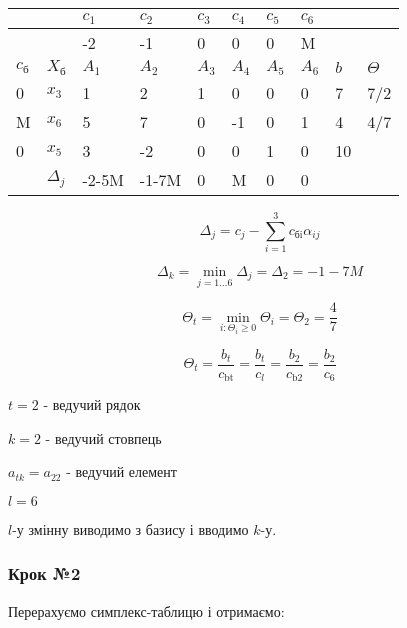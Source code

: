 \documentclass[a4paper, 12pt]{article}
\begin{document}
\begin{table}[H]
    \centering
    \begin{tabular}{|l|l|l|l|l|l|l|l|l|l|}
    \hline
         &  & $c_1$ & $c_2$ & $c_3$ & $c_4$ & $c_5$ & $c_6$ & & \\ \hline
         &  & -2 & -1 & 0 & 0 & 0 & M &  &  \\ \hline
         $c_\text{б}$ & $X_\text{б}$ & $A_1$ & $A_2$ & $A_3$ & $A_4$ & $A_5$ & $A_6$ & $b$  & $\Theta$ \\ \hline
        0 & $x_3$ & 1 & 2 & 1 & 0 & 0 & 0 & 7 & 7/2 \\ \hline
        M & $x_6$ & 5 & 7 & 0 & -1 & 0 & 1 & 4 & 4/7 \\ \hline
        0 & $x_5$ & 3 & -2 & 0 & 0 & 1 & 0 & 10 &  \\ \hline
         & $\Delta_j$ & -2-5M & -1-7M & 0 & M & 0 & 0 &  &  \\ \hline
    \end{tabular}
\end{table}

\begin{equation*}
	\Delta_j = c_j - \sum_{i=1}^{3} c_\text{бi} \alpha_{ij}  
\end{equation*}

\begin{equation*}
	\Delta_k = \min_{j=1 \dots 6} \Delta_j = \Delta_2 = -1-7M
\end{equation*}

\begin{equation*}
	\Theta_t = \min_{i: \Theta_i \geqslant 0} \Theta_i = \Theta_2 = \frac{4}{7}
\end{equation*}

\begin{equation*}
	\Theta_t = \frac{b_t}{c_\text{bt}} = \frac{b_t}{c_l} = \frac{b_2}{c_\text{b2}} = \frac{b_2}{c_\text{6}}
\end{equation*}

$t = 2$ - ведучий рядок

$k = 2$ - ведучий стовпець

$a_{tk} = a_{22}$ - ведучий елемент

$l = 6$

$l$-у змінну виводимо з базису і вводимо $k$-у.

\subsubsection{Крок №2}

Перерахуємо симплекс-таблицю і отримаємо:
\end{document}
